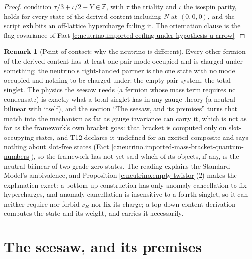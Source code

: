 \documentclass[11pt]{article}
\theoremstyle{definition}
\newtheorem{remark}[theorem]{Remark}
\theoremstyle{plain}
\begin{document}
\begin{proof}
condition $\tau/3 + \iota/2 + Y \in \mathbb{Z}$, with $\tau$ the triality and $\iota$ the isospin parity, holds for every state of the derived content including $N$ at $(0, 0, 0)$, and the script exhibits an off-lattice hypercharge failing it. The orientation clause is the flag covariance of Fact \ref{c:neutrino.imported-ceiling-under-hypothesis-u-arrow}.

\end{proof}

\begin{remark}[Point of contact: why the neutrino is different]\label{c:note.neutrino.point-contact-why-neutrino-different}
Every other fermion of the derived content has at least one pair mode occupied and is charged under something; the neutrino's right-handed partner is the one state with no mode occupied and nothing to be charged under: the empty pair system, the total singlet. The physics the seesaw needs (a fermion whose mass term requires no condensate) is exactly what a total singlet has in any gauge theory (a neutral bilinear with itself), and the section ``The seesaw, and its premises'' turns that match into the mechanism as far as gauge invariance can carry it, which is not as far as the framework's own bracket goes: that bracket is computed only on slot-occupying states, and T12 declares it undefined for an excited composite and says nothing about slot-free states (Fact \ref{c:neutrino.imported-mass-bracket-quantum-numbers}), so the framework has not yet said which of its objects, if any, is the neutral bilinear of two grade-zero states. The reading explains the Standard Model's ambivalence, and Proposition \ref{c:neutrino.empty-twistor}(2) makes the explanation exact: a bottom-up construction has only anomaly cancellation to fix hypercharges, and anomaly cancellation is insensitive to a fourth singlet, so it can neither require nor forbid $\nu_{R}$ nor fix its charge; a top-down content derivation computes the state and its weight, and carries it necessarily.
\end{remark}

\section{The seesaw, and its premises}
\end{document}
